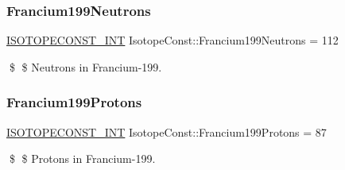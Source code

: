 \subsubsection{\texorpdfstring{Francium199\+Neutrons}{Francium199Neutrons}}
{\footnotesize\ttfamily \mbox{\hyperlink{group___isotope_const-_macros_ga5f18360b3e99483a35c32d789e62621c}{I\+S\+O\+T\+O\+P\+E\+C\+O\+N\+S\+T\+\_\+\+I\+NT}} Isotope\+Const\+::\+Francium199\+Neutrons = 112}

\$ \$ Neutrons in Francium-\/199. \mbox{\label{group___isotope_const-_francium-_fr199_ga4aeabfd96fbace03c9863a8db08ba5ee}} 
\subsubsection{\texorpdfstring{Francium199\+Protons}{Francium199Protons}}
{\footnotesize\ttfamily \mbox{\hyperlink{group___isotope_const-_macros_ga5f18360b3e99483a35c32d789e62621c}{I\+S\+O\+T\+O\+P\+E\+C\+O\+N\+S\+T\+\_\+\+I\+NT}} Isotope\+Const\+::\+Francium199\+Protons = 87}

\$ \$ Protons in Francium-\/199. 